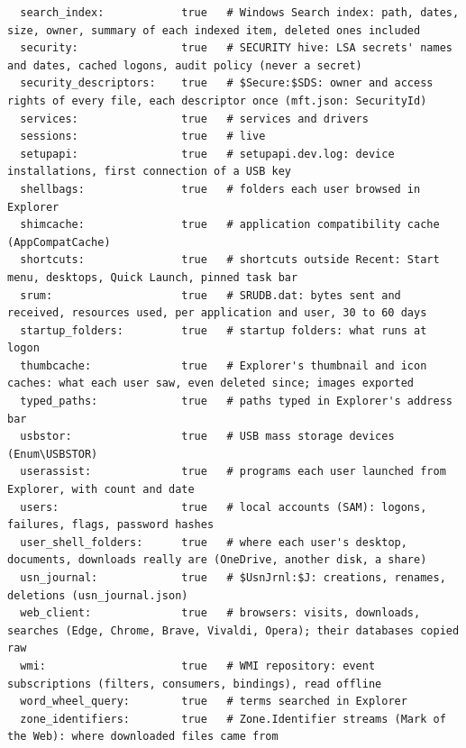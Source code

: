 \documentclass[11pt,a4paper,oneside]{report}
\begin{document}
\begin{lstlisting}
  search_index:            true   # Windows Search index: path, dates, size, owner, summary of each indexed item, deleted ones included
  security:                true   # SECURITY hive: LSA secrets' names and dates, cached logons, audit policy (never a secret)
  security_descriptors:    true   # $Secure:$SDS: owner and access rights of every file, each descriptor once (mft.json: SecurityId)
  services:                true   # services and drivers
  sessions:                true   # live
  setupapi:                true   # setupapi.dev.log: device installations, first connection of a USB key
  shellbags:               true   # folders each user browsed in Explorer
  shimcache:               true   # application compatibility cache (AppCompatCache)
  shortcuts:               true   # shortcuts outside Recent: Start menu, desktops, Quick Launch, pinned task bar
  srum:                    true   # SRUDB.dat: bytes sent and received, resources used, per application and user, 30 to 60 days
  startup_folders:         true   # startup folders: what runs at logon
  thumbcache:              true   # Explorer's thumbnail and icon caches: what each user saw, even deleted since; images exported
  typed_paths:             true   # paths typed in Explorer's address bar
  usbstor:                 true   # USB mass storage devices (Enum\USBSTOR)
  userassist:              true   # programs each user launched from Explorer, with count and date
  users:                   true   # local accounts (SAM): logons, failures, flags, password hashes
  user_shell_folders:      true   # where each user's desktop, documents, downloads really are (OneDrive, another disk, a share)
  usn_journal:             true   # $UsnJrnl:$J: creations, renames, deletions (usn_journal.json)
  web_client:              true   # browsers: visits, downloads, searches (Edge, Chrome, Brave, Vivaldi, Opera); their databases copied raw
  wmi:                     true   # WMI repository: event subscriptions (filters, consumers, bindings), read offline
  word_wheel_query:        true   # terms searched in Explorer
  zone_identifiers:        true   # Zone.Identifier streams (Mark of the Web): where downloaded files came from
\end{lstlisting}
\end{document}
